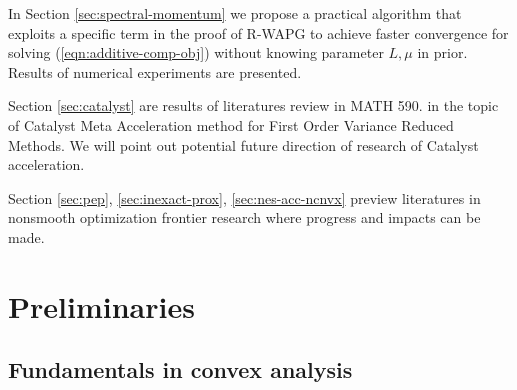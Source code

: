 \documentclass[12pt]{article}
\begin{document}
    In Section \ref{sec:spectral-momentum} we propose a practical algorithm that exploits a specific term in the proof of R-WAPG to achieve faster convergence for solving (\ref{eqn:additive-comp-obj}) without knowing parameter $L, \mu$ in prior. 
    Results of numerical experiments are presented. 
    \par
    Section \ref{sec:catalyst} are results of literatures review in MATH 590. 
     in the topic of Catalyst Meta Acceleration method for First Order Variance Reduced Methods. 
    We will point out potential future direction of research of Catalyst acceleration. 
    \par
    Section \ref{sec:pep}, \ref{sec:inexact-prox}, \ref{sec:nes-acc-ncnvx} preview literatures in  nonsmooth optimization frontier research where progress and impacts can be made.  



    
\section{Preliminaries}
    \subsection{Fundamentals in convex analysis}
        
\end{document}
